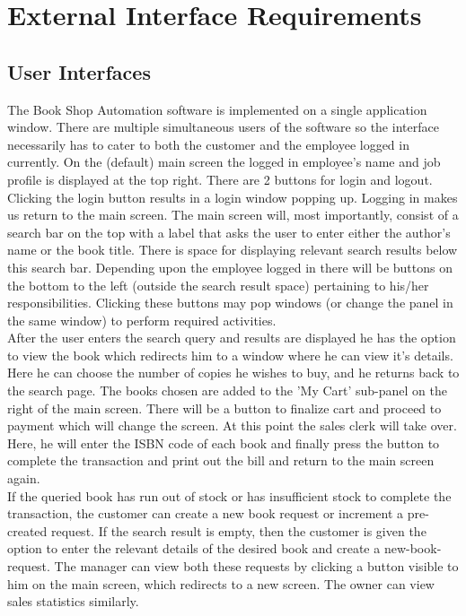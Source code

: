 \documentclass{scrreprt}
\begin{document}
\chapter{External Interface Requirements}
\section{User Interfaces}
The Book Shop Automation software is implemented on a single application window. There are multiple simultaneous users of the software so the interface necessarily has to cater to both the customer and the employee logged in currently. On the (default) main screen the logged in employee's name and job profile is displayed at the top right. There are 2 buttons for login and logout. Clicking the login button results in a login window popping up. Logging in makes us return to the main screen. The main screen will, most importantly, consist of a search bar on the top with a label that asks the user to enter either the author's name or the book title. There is space for displaying relevant search results below this search bar. Depending upon the employee logged in there will be buttons on the bottom to the left (outside the search result space) pertaining to his/her responsibilities. Clicking these buttons may pop windows (or change the panel in the same window) to perform required activities.\\


After the user enters the search query and results are displayed he has the option to view the book which redirects him to a window where he can view it's details. Here he can choose the number of copies he wishes to buy, and he returns back to the search page. The books chosen are added to the 'My Cart' sub-panel on the right of the main screen. There will be a button to finalize cart and proceed to payment which will change the screen. At this point the sales clerk will take over. Here, he will enter the ISBN code of each book and finally press the button to complete the transaction and print out the bill and return to the main screen again.\\

If the queried book has run out of stock or has insufficient stock to complete the transaction, the customer  can create a new book request or increment a pre-created request. If the search result is empty, then the customer is given the option to enter the relevant details of the desired book and create a new-book-request. The manager can view  both these requests by clicking a button visible to him on the main screen, which redirects to a new screen. The owner can view sales statistics similarly.
\end{document}
